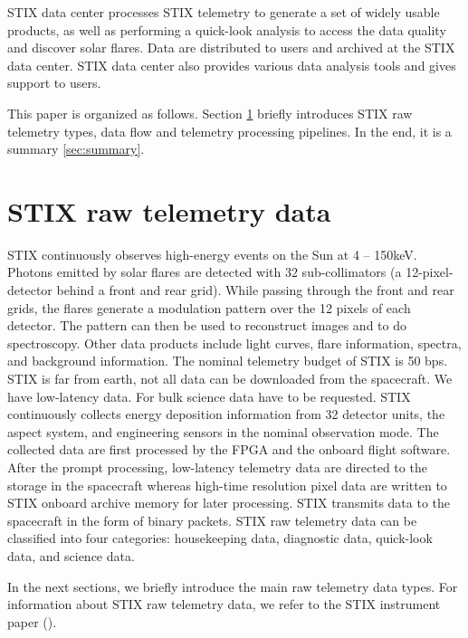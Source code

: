 \documentclass[referee]{aa} %
\begin{document}
STIX data center processes STIX telemetry to generate a set of widely usable products, as well as performing a quick-look
analysis to access the data quality and discover solar flares. Data are distributed to users and archived at the STIX data center. 
STIX data center also provides various data analysis tools and gives support to users. 

This paper is organized as follows. Section \ref{sec:raw-data} briefly introduces STIX raw telemetry types, data flow and
telemetry processing pipelines. 
In the end, it is a summary \ref{sec:summary}.
\section{STIX raw telemetry data}
\label{sec:raw-data}
STIX continuously observes high-energy events on the Sun at 4 -- 150keV. 
Photons emitted by solar flares are detected with 32 sub-collimators 
(a 12-pixel-detector behind a front and rear grid). While passing through the front and rear grids, 
the flares generate a modulation pattern over the 12 pixels of each detector. 
The pattern can then be used to reconstruct images and to do spectroscopy. 
Other data products include light curves, flare information, spectra, and background information.
The nominal telemetry budget of STIX is 50 bps.
STIX is far from earth, not all data can be downloaded from the spacecraft. We have low-latency data.
For bulk science data have to be requested.
STIX continuously collects energy deposition information from 32 detector units, the aspect system,
and engineering sensors in the nominal observation mode.
The collected data are first processed by the FPGA and the onboard flight software.
After the prompt processing, low-latency telemetry data are directed to the
storage in the spacecraft whereas high-time resolution pixel data are written to STIX onboard archive memory for
later processing.
STIX transmits data to the spacecraft in the form of binary packets.
STIX raw telemetry data can be classified into four
categories: housekeeping data, diagnostic data, quick-look data, and science data.

In the next sections, we briefly introduce the main raw telemetry data types.
For information about STIX raw telemetry data, we refer to the STIX instrument paper (\cite{StixInstrument}).
\end{document}
